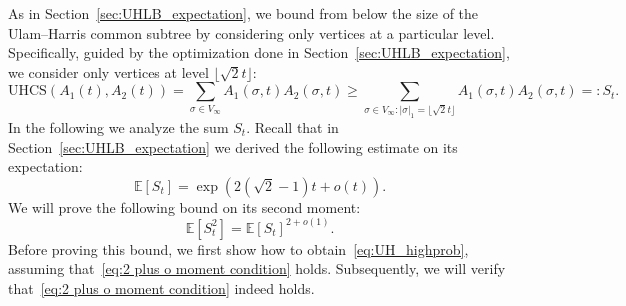\documentclass[11pt]{article}
\numberwithin{equation}{section}
\newcommand{\E}{\mathbb{E}} %
\newcommand{\UHCS}{\mathrm{UHCS}} %
\theoremstyle{definition}
\begin{document}
As in Section~\ref{sec:UHLB_expectation}, 
we bound from below the size of the Ulam--Harris common subtree 
by considering only vertices at a particular level. 
Specifically, guided by the optimization done in Section~\ref{sec:UHLB_expectation},
we consider only vertices at level 
$\lfloor \sqrt{2} t \rfloor$: 
\begin{equation}\label{eq:UHCS_LB}
\UHCS(A_{1}(t), A_{2}(t)) 
=
\sum_{\sigma \in V_{\infty}} A_{1}(\sigma, t) A_{2}(\sigma, t) 
\geq 
\sum_{\sigma \in V_{\infty}: |\sigma|_{1} = \lfloor \sqrt{2} t \rfloor} A_{1}(\sigma, t) A_{2}(\sigma, t) =: S_{t}.
\end{equation}
In the following we analyze the sum $S_{t}$. Recall that in Section~\ref{sec:UHLB_expectation} we derived the following estimate on its expectation: 
\begin{equation}\label{eq:S_t_expectation}
\E[S_{t}] 
= \exp \left( 2 \left( \sqrt{2} - 1 \right) t + o(t) \right).
\end{equation}
We will prove the following bound on its second moment: 
\begin{equation}\label{eq:2 plus o moment condition}
\E \left[ S_{t}^{2} \right] = \E \left[ S_{t} \right]^{2+o(1)}.
\end{equation}
Before proving this bound, we first show how to obtain~\eqref{eq:UH_highprob}, assuming that~\eqref{eq:2 plus o moment condition} holds. Subsequently, we will verify that~\eqref{eq:2 plus o moment condition} indeed holds. 
\end{document}
